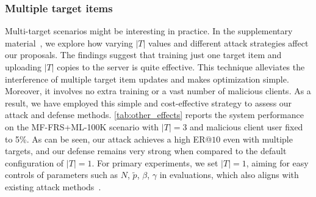 \subsubsection{Multiple target items}

Multi-target scenarios might be interesting in practice. In the supplementary material~\cite{github-pieck-supple}, we explore how varying $|T|$ values and different attack strategies affect our proposals.
The findings suggest that training just one target item and uploading $|T|$ copies to the server is quite effective.
This technique alleviates the interference of multiple target item updates and makes optimization simple. Moreover, it involves no extra training or a vast number of malicious clients.
As a result, we have employed this simple and cost-effective strategy to assess our attack and defense methods.
\cref{tab:other_effects} reports the system performance on the MF-FRS+ML-100K scenario with $|T|=3$ and malicious client user fixed to 5\%.
As can be seen, our attack achieves a high ER@$10$ even with multiple targets, and our defense remains very strong when compared to the default configuration of $|T|=1$.
For primary experiments, we set $|T|=1$, aiming for easy controls of parameters such as $N$, $\tilde{p}$, $\beta$, $\gamma$ in evaluations, which also aligns with existing attack methods~\cite{a-hum,fedrecattack,pipattack}.

